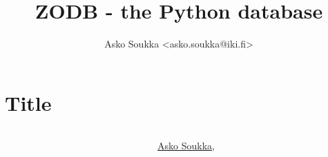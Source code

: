 \documentclass[aspectratio=169]{beamer}
\title{ZODB - the Python database}
\author{Asko Soukka <asko.soukka@iki.fi>}
\begin{document}
\section{Title}

{
\begin{frame}[plain,t]
  \begin{columns}[onlytextwidth]
    \begin{column}{0.45\textwidth}
    \end{column}
    \begin{column}{0.45\textwidth}
      \vspace{0.5cm}
      \par
      \centering
      \href{http://iki.fi/asko.soukka/}{Asko Soukka},

\end{column}
\end{columns}
\end{frame}}
\end{document}
